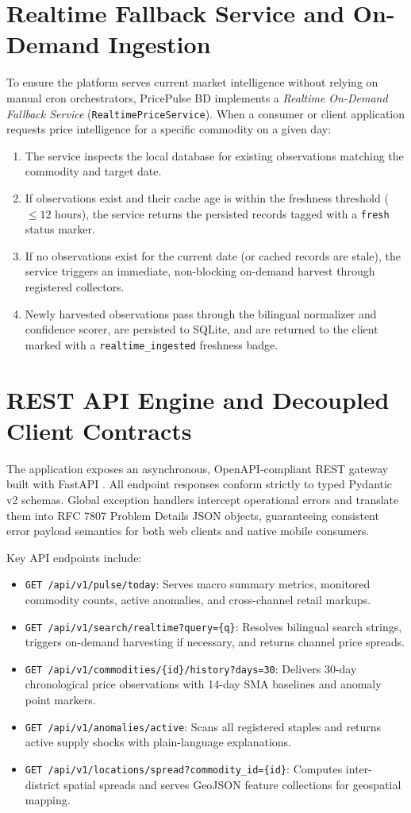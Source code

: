 \section{Realtime Fallback Service and On-Demand Ingestion}
To ensure the platform serves current market intelligence without relying on manual cron orchestrators, PricePulse BD implements a \textit{Realtime On-Demand Fallback Service} (\texttt{RealtimePriceService}). When a consumer or client application requests price intelligence for a specific commodity on a given day:
\begin{enumerate}
    \item The service inspects the local database for existing observations matching the commodity and target date.
    \item If observations exist and their cache age is within the freshness threshold ($\le 12$ hours), the service returns the persisted records tagged with a \texttt{fresh} status marker.
    \item If no observations exist for the current date (or cached records are stale), the service triggers an immediate, non-blocking on-demand harvest through registered collectors.
    \item Newly harvested observations pass through the bilingual normalizer and confidence scorer, are persisted to SQLite, and are returned to the client marked with a \texttt{realtime\_ingested} freshness badge.
\end{enumerate}

\section{REST API Engine and Decoupled Client Contracts}
The application exposes an asynchronous, OpenAPI-compliant REST gateway built with FastAPI \cite{ramirez2020rest}. All endpoint responses conform strictly to typed Pydantic v2 schemas. Global exception handlers intercept operational errors and translate them into RFC 7807 Problem Details JSON objects, guaranteeing consistent error payload semantics for both web clients and native mobile consumers.

Key API endpoints include:
\begin{itemize}
    \item \texttt{GET /api/v1/pulse/today}: Serves macro summary metrics, monitored commodity counts, active anomalies, and cross-channel retail markups.
    \item \texttt{GET /api/v1/search/realtime?query=\{q\}}: Resolves bilingual search strings, triggers on-demand harvesting if necessary, and returns channel price spreads.
    \item \texttt{GET /api/v1/commodities/\{id\}/history?days=30}: Delivers 30-day chronological price observations with 14-day SMA baselines and anomaly point markers.
    \item \texttt{GET /api/v1/anomalies/active}: Scans all registered staples and returns active supply shocks with plain-language explanations.
    \item \texttt{GET /api/v1/locations/spread?commodity\_id=\{id\}}: Computes inter-district spatial spreads and serves GeoJSON feature collections for geospatial mapping.
\end{itemize}
